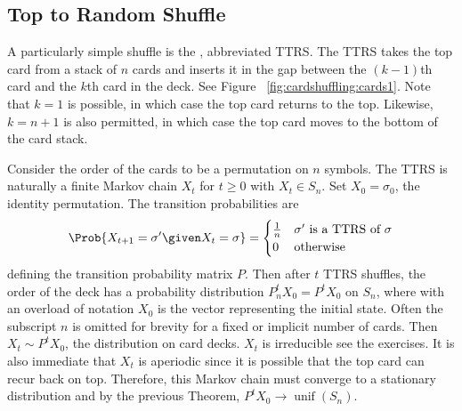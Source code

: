 \documentclass[12pt]{article}
\begin{document}
\subsection*{Top to Random Shuffle} A particularly simple shuffle is the
,%
abbreviated TTRS\@.  The TTRS takes the top card from a stack of \( n \)
cards and inserts it in the gap between the \( (k-1) \)th card and the \(
k \)th card in the deck.  See Figure~%
\ref{fig:cardshuffling:cards1}.  Note that \( k = 1 \) is possible, in
which case the top card returns to the top.  Likewise, \( k = n+1 \) is
also permitted, in which case the top card moves to the bottom of the
card stack.

Consider the order of the cards to be a permutation on \( n \) symbols.
The TTRS is naturally a finite Markov chain \( X_t \) for \( t \ge 0 \)
with \( X_t \in S_n \).  Set \( X_0 = \sigma_0 \), the identity
permutation.  The transition probabilities are
\[
    \Prob{X_{t+1} = \sigma' \given X_t = \sigma} =
    \begin{cases}
        \frac{1}{n} & \text{\( \sigma' \) is a TTRS of \( \sigma \)}\\
        0 & \text{otherwise}
    \end{cases}
\] defining the transition probability matrix \( P \). Then after \( t \)
TTRS shuffles, the order of the deck has a probability distribution \( P^t_n
X_0 = P^t X_0 \) on \( S_n \), where with an overload of notation \( X_0
\) is the vector representing the initial state. Often the subscript \(
n \) is omitted for brevity for a fixed or implicit number of cards.
Then \( X_t \sim P^t X_0 \), the distribution on card decks. \( X_t \)
is irreducible see the exercises.  It is also immediate that \( X_t \)
is aperiodic since it is possible that the top card can recur back on
top.  Therefore, this Markov chain must converge to a stationary
distribution and by the previous Theorem, \( P^t X_0 \to
\operatorname{unif}
(S_n) \).
\end{document}
